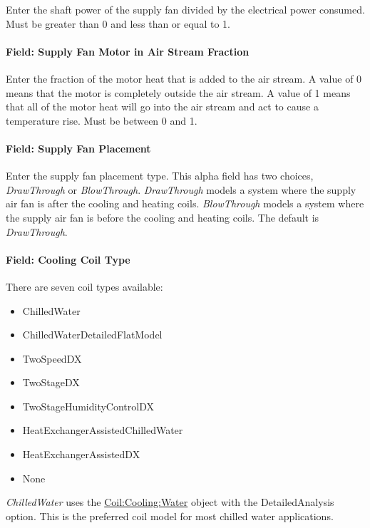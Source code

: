 Enter the shaft power of the supply fan divided by the electrical power consumed. Must be greater than 0 and less than or equal to 1.

\paragraph{Field: Supply Fan Motor in Air Stream Fraction}\label{field-supply-fan-motor-in-air-stream-fraction-7}

Enter the fraction of the motor heat that is added to the air stream. A value of 0 means that the motor is completely outside the air stream. A value of 1 means that all of the motor heat will go into the air stream and act to cause a temperature rise. Must be between 0 and 1.

\paragraph{Field: Supply Fan Placement}\label{field-supply-fan-placement-10}

Enter the supply fan placement type. This alpha field has two choices, \emph{DrawThrough} or \emph{BlowThrough}. \emph{DrawThrough} models a system where the supply air fan is after the cooling and heating coils. \emph{BlowThrough} models a system where the supply air fan is before the cooling and heating coils. The default is \emph{DrawThrough}.

\paragraph{Field: Cooling Coil Type}\label{field-cooling-coil-type-12}

There are seven coil types available:

\begin{itemize}
\item
  ChilledWater
\item
  ChilledWaterDetailedFlatModel
\item
  TwoSpeedDX
\item
  TwoStageDX
\item
  TwoStageHumidityControlDX
\item
  HeatExchangerAssistedChilledWater
\item
  HeatExchangerAssistedDX
\item
  None
\end{itemize}

\emph{ChilledWater} uses the \hyperref[coilcoolingwater]{Coil:Cooling:Water} object with the DetailedAnalysis option. This is the preferred coil model for most chilled water applications.

